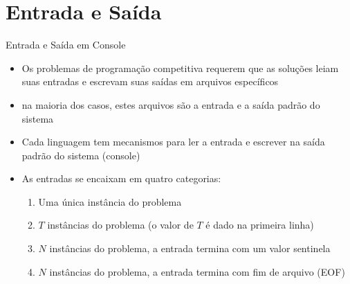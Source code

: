 \section{Entrada e Saída}

\begin{frame}[fragile]{Entrada e Saída em Console}

    \begin{itemize}
        \item Os problemas de programação competitiva requerem que as soluções 
        leiam suas entradas e escrevam suas saídas em arquivos específicos
        \item na maioria dos casos, estes arquivos são a entrada e a saída padrão do sistema
        \item Cada linguagem tem mecanismos para ler a entrada e escrever na saída padrão do 
        sistema (console)
        \item As entradas se encaixam em quatro categorias:
        \begin{enumerate}
            \item Uma única instância do problema
            \item $T$ instâncias do problema (o valor de $T$ é dado na primeira linha)
            \item $N$ instâncias do problema, a entrada termina com um valor sentinela
            \item $N$ instâncias do problema, a entrada termina com fim de arquivo (EOF)
        \end{enumerate}

    \end{itemize}

\end{frame}

